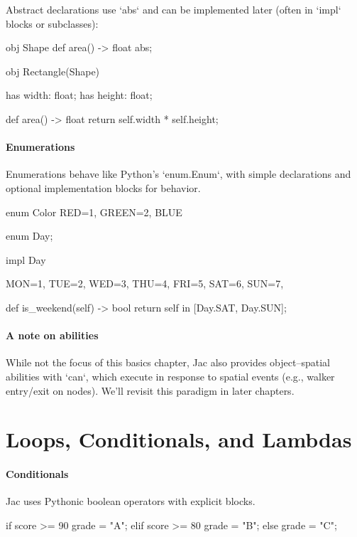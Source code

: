 Abstract declarations use `abs` and can be implemented later (often in `impl` blocks or subclasses):

\begin{jacblock}
obj Shape {
    def area() -> float abs;
}

obj Rectangle(Shape) {
    has width: float;
    has height: float;

    def area() -> float { return self.width * self.height; }
}
\end{jacblock}

\paragraph{Enumerations}

Enumerations behave like Python's `enum.Enum`, with simple declarations and optional implementation blocks for behavior.

\begin{jacblock}
enum Color { RED=1, GREEN=2, BLUE }

enum Day;

impl Day {
    MON=1, TUE=2, WED=3, THU=4, FRI=5, SAT=6, SUN=7,

    def is_weekend(self) -> bool { return self in [Day.SAT, Day.SUN]; }
}
\end{jacblock}

\paragraph{A note on abilities}

While not the focus of this basics chapter, Jac also provides object–spatial abilities with `can`, which execute in response to spatial events (e.g., walker entry/exit on nodes). We'll revisit this paradigm in later chapters.

\section{Loops, Conditionals, and Lambdas}

\paragraph{Conditionals}

Jac uses Pythonic boolean operators with explicit blocks.

\begin{jacblock}
if score >= 90 {
    grade = "A";
} elif score >= 80 {
    grade = "B";
} else {
    grade = "C";
}
\end{jacblock}

